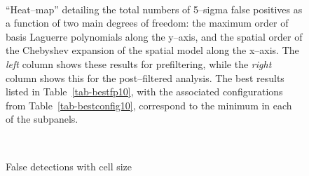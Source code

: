 \documentclass[prd, nofootinbib, floatfix, 11pt,tightenlines,times]{article}
\begin{document}
\begin{figure}
 \\
\caption{``Heat--map'' detailing the total numbers of 5--sigma false
  positives as a function of two main degrees of freedom: the maximum
  order of basis Laguerre polynomials along the y--axis, and the
  spatial order of the Chebyshev expansion of the spatial model along
  the x--axis.  The {\it left} column shows these results for
  prefiltering, while the {\it right} column shows this for the
  post--filtered analysis.  The best results listed in
  Table~\ref{tab-bestfp10}, with the associated configurations from
  Table~\ref{tab-bestconfig10}, correspond to the minimum in each of the
  subpanels.  }
\label{fp_heatmap}
\end{figure}

\begin{figure}
 \\
\caption{False detections with cell size
}
\label{cellsize}
\end{figure}
\end{document}
